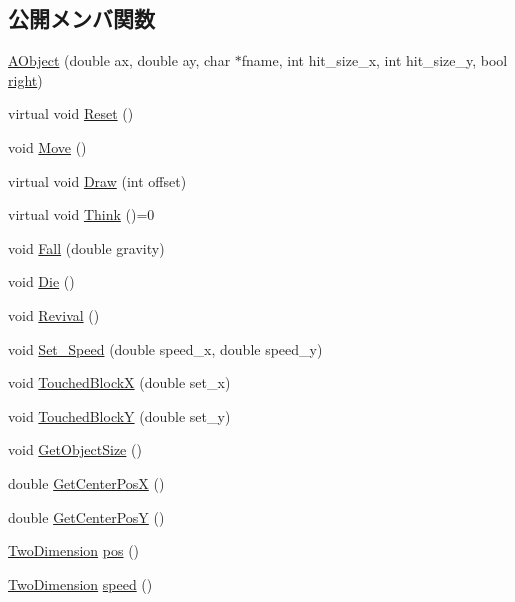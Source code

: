 \subsection*{公開メンバ関数}
\begin{DoxyCompactItemize}
\item 
\hyperlink{class_a_object_a1956c3120bdc7f0372a5aab8c0b1cbb6}{A\+Object} (double ax, double ay, char $\ast$fname, int hit\+\_\+size\+\_\+x, int hit\+\_\+size\+\_\+y, bool \hyperlink{class_a_object_a7453abe76bbddf446aa5787231428a52}{right})
\item 
virtual void \hyperlink{class_a_object_aa07f4874e508e22cc0980e5ab6eb7f54}{Reset} ()
\item 
void \hyperlink{class_a_object_a60fae4021ac710983beefcf8cdb7f3bd}{Move} ()
\item 
virtual void \hyperlink{class_a_object_a0e279a93c79be5807e9bbd20875369a2}{Draw} (int offset)
\item 
virtual void \hyperlink{class_a_object_a61f89197cb14b1270a0a232ee88333a0}{Think} ()=0
\item 
void \hyperlink{class_a_object_a95c42b1bcef8f364389d9cf131a37921}{Fall} (double gravity)
\item 
void \hyperlink{class_a_object_a6661473a035f6e0ee0e7d98182630389}{Die} ()
\item 
void \hyperlink{class_a_object_aab646016a7b8d3040e2e3675e74d0629}{Revival} ()
\item 
void \hyperlink{class_a_object_a5266e7cb202fc1c27ac66fb8372410cb}{Set\+\_\+\+Speed} (double speed\+\_\+x, double speed\+\_\+y)
\item 
void \hyperlink{class_a_object_a6547fb1f7e3b5c5aab84b0b787e2869c}{Touched\+Block\+X} (double set\+\_\+x)
\item 
void \hyperlink{class_a_object_acfe5d595ef8c3387b1bbba51cb397602}{Touched\+Block\+Y} (double set\+\_\+y)
\item 
void \hyperlink{class_a_object_aa4d5ec1e9ece904effd747657f4e4530}{Get\+Object\+Size} ()
\item 
double \hyperlink{class_a_object_af18a89079a95159f7b93a92a921f4b54}{Get\+Center\+Pos\+X} ()
\item 
double \hyperlink{class_a_object_a33c32784ef245183b0207811c0f88521}{Get\+Center\+Pos\+Y} ()
\item 
\hyperlink{struct_two_dimension}{Two\+Dimension} \hyperlink{class_a_object_a71a4ba584e2a76b73ed623deeb7d1358}{pos} ()
\item 
\hyperlink{struct_two_dimension}{Two\+Dimension} \hyperlink{class_a_object_abb924b7e558a2f9d86f2db2bc2fb18a4}{speed} ()

\end{DoxyCompactItemize}
